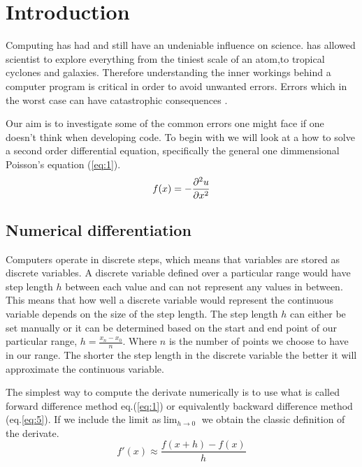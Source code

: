 \section*{Introduction}
Computing has had and still have an undeniable influence on science.
has allowed scientist to explore everything from the tiniest scale of an atom,to tropical cyclones and galaxies.
Therefore understanding the inner workings behind a computer program is critical in order to avoid unwanted errors. Errors which in the worst case can have catastrophic consequences \cite{sleipner_failure}. \par Our aim is to investigate some of the common errors one might face if one doesn't think when developing code. To begin with we will look at a how to solve a second order differential equation, specifically the general one dimmensional Poisson's equation (\ref{eq:1}).
\begin{equation}\label{eq:2}
  f(x)= - \pd[^2u]{x^2}
\end{equation}

\subsection*{Numerical differentiation}
\par Computers operate in discrete steps, which means that variables are stored
as discrete variables. A discrete variable defined over a particular range would
have step length $h$ between each value and can not represent any values in
between. This means that how well a discrete variable would represent the
continuous variable depends on the size of the step length. The step length $h$
can either be set manually or it can be determined based on the start and end
point of our particular range, $h = \frac{x_n -x_0}{n}$. Where $n$ is the number
of points we choose to have in our range. The shorter the step length in the
discrete variable the better it will approximate the continuous variable.  
\par
The simplest way to compute the derivate numerically is to use what is called
forward difference method eq.(\ref{eq:1}) or equivalently backward difference
method (eq.\ref{eq:5}). If we include the limit as$\lim_{h\to 0}$ we obtain the
classic definition of the derivate. 
\begin{equation}\label{eq:1}
    f'(x) \approx \frac{f(x+h)-f(x)}{h}
\end{equation}

